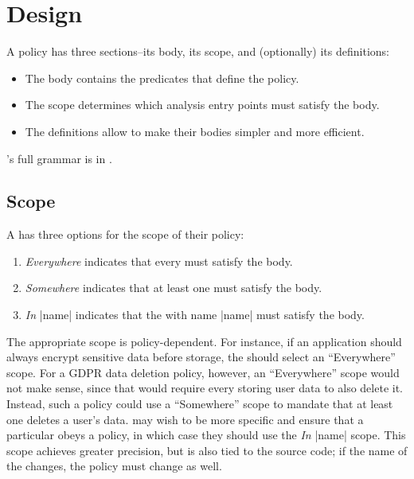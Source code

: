 \chapter{Design}
\label{sec:interface}

A \syslang{} policy has three sections--its body, its scope, and (optionally) its definitions:
%
\begin{itemize}[nosep]
  \item The body contains the predicates that define the policy.
  \item The scope determines which analysis entry points must satisfy the body.
  \item The definitions allow \ces{} to make their bodies simpler and more efficient.
\end{itemize}

\syslang{}'s full grammar is in .

\section{Scope}
\label{sec:scope}

A \ce{} has three options for the scope of their policy:
%
\begin{enumerate}[nosep]
    \item \emph{Everywhere} indicates that every \controller{} must satisfy the body.
    \item \emph{Somewhere} indicates that at least one \controller{} must satisfy the body.
    \item \emph{In} |name| indicates that the \controller{} with name |name| must satisfy the body.
\end{enumerate}

The appropriate scope is policy-dependent.
%
For instance, if an application should always encrypt sensitive data before storage,
the \ce{} should select an ``Everywhere'' scope.
%
For a GDPR data deletion policy, however, an ``Everywhere'' scope would not make sense, 
since that would require every \controller{} storing user data to also delete it.
%
Instead, such a policy could use a ``Somewhere'' scope to mandate that at least one \controller{} deletes a user's data.
%
\Ces{} may wish to be more specific and ensure that a particular \controller{} obeys a policy,
in which case they should use the \emph{In} |name| scope.
%
This scope achieves greater precision, but is also tied to the source code; 
if the name of the \controller{} changes, the policy must change as well.
%

